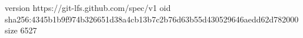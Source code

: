 version https://git-lfs.github.com/spec/v1
oid sha256:4345b1b9f974b326651d38a4cb13b7c2b76d63b55d430529646aedd62d782000
size 6527
